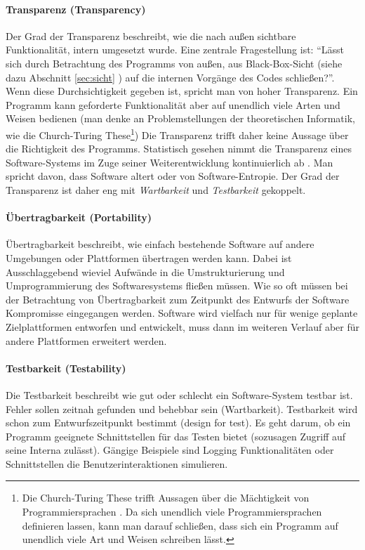\paragraph{Transparenz (Transparency)} Der Grad der Transparenz beschreibt, wie die nach außen sichtbare Funktionalität, intern umgesetzt wurde. Eine zentrale Fragestellung ist: ``Lässt sich durch Betrachtung des Programms von außen, aus Black-Box-Sicht (siehe dazu Abschnitt \ref{sec:sicht} ) auf die internen Vorgänge des Codes schließen?''. Wenn diese Durchsichtigkeit gegeben ist, spricht man von hoher Transparenz. Ein Programm kann geforderte Funktionalität aber auf unendlich viele Arten und Weisen bedienen (man denke an Problemstellungen der theoretischen Informatik, wie die Church-Turing These\footnote{Die Church-Turing These trifft Aussagen über die Mächtigkeit von Programmiersprachen \cite{hoffmann_theoretische_2011}. Da sich unendlich viele Programmiersprachen definieren lassen, kann man darauf schließen, dass sich ein Programm auf unendlich viele Art und Weisen schreiben lässt.}) Die Transparenz trifft daher keine Aussage über die Richtigkeit des Programms. Statistisch gesehen nimmt die Transparenz eines Software-Systems im Zuge seiner Weiterentwicklung kontinuierlich ab \cite{hoffmann_software-qualitat_2013}. Man spricht davon, dass Software altert oder von Software-Entropie. Der Grad der Transparenz ist daher eng mit \textit{Wartbarkeit} und \textit{Testbarkeit} gekoppelt. 

\paragraph{Übertragbarkeit (Portability)} Übertragbarkeit beschreibt, wie einfach bestehende Software auf andere Umgebungen oder Plattformen übertragen werden kann. Dabei ist Ausschlaggebend wieviel Aufwände in die Umstrukturierung und Umprogrammierung des Softwaresystems fließen müssen. Wie so oft müssen bei der Betrachtung von Übertragbarkeit zum Zeitpunkt des Entwurfs der Software Kompromisse eingegangen werden. Software wird vielfach nur für wenige geplante Zielplattformen entworfen und entwickelt, muss dann im weiteren Verlauf aber für andere Plattformen erweitert werden.

\paragraph{Testbarkeit (Testability)} Die Testbarkeit beschreibt wie gut oder schlecht ein Software-System testbar ist. Fehler sollen zeitnah gefunden und behebbar sein (Wartbarkeit). Testbarkeit wird schon zum Entwurfszeitpunkt bestimmt (design for test). Es geht darum, ob ein Programm geeignete Schnittstellen für das Testen bietet (sozusagen Zugriff auf seine Interna zulässt). Gängige Beispiele sind Logging Funktionalitäten oder Schnittstellen die Benutzerinteraktionen simulieren.

